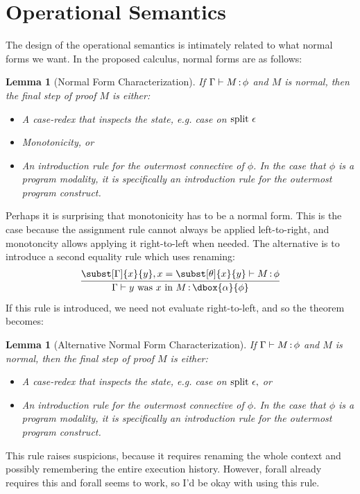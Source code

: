 \documentclass[12pt]{cmuthesis}
\newtheorem{lemma}[theorem]{Lemma}
\theoremstyle{definition}
\theoremstyle{remark}
\begin{document}
\section{Operational Semantics}
The design of the operational semantics is intimately related to what normal forms we want.
In the proposed calculus, normal forms are as follows:
\begin{lemma}[Normal Form Characterization]
\label{lem:normal-forms}
If $\Gamma \vdash M\mathop{:}\phi$ and $M$ is normal, then the final step of proof $M$ is either:
\begin{itemize}
\item A case-redex that inspects the state, e.g. case on $\textrm{split }\epsilon$
\item Monotonicity, or
\item An introduction rule for the outermost connective of $\phi$.
       In the case that $\phi$ is a program modality, it is specifically an introduction rule for the outermost program construct.
\end{itemize}
\end{lemma}
Perhaps it is surprising that monotonicity has to be a normal form.
This is the case because the assignment rule cannot always be applied left-to-right, and monotoncity allows applying it right-to-left when needed.
The alternative is to introduce a second equality rule which uses renaming:
\[\infer{\proves{\G}{\easgneq{y}{x}{M}}{\dbox{\alpha}{\phi}}}
          {\proves{\subst[\G]{x}{y},x=\subst[\theta]{x}{y}}{M}{\phi}}\]
If this rule is introduced, we need not evaluate right-to-left, and so the theorem becomes:
\begin{lemma}[Alternative Normal Form Characterization]
\label{lem:normal-forms-alt}
If $\Gamma \vdash M\mathop{:}\phi$ and $M$ is normal, then the final step of proof $M$ is either:
\begin{itemize}
\item A case-redex that inspects the state, e.g. case on $\textrm{split }\epsilon,$ or
\item An introduction rule for the outermost connective of $\phi$.
       In the case that $\phi$ is a program modality, it is specifically an introduction rule for the outermost program construct.
\end{itemize}
\end{lemma}
This rule raises suspicions, because it requires renaming the whole context and possibly remembering the entire execution history.
However, forall already requires this and forall seems to work, so I'd be okay with using this rule.
\end{document}
